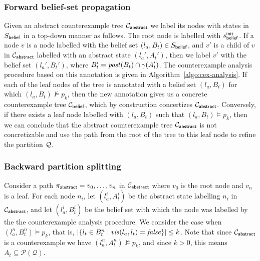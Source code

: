 \subsubsection{Forward belief-set propagation}
Given an abstract counterexample tree $\mathcal{C}_{\mathsf{abstract}}$ we label its nodes with states in $S_{\mathsf{belief}}$ in a top-down manner as follows. 
The root node is labelled with $s_{\mathsf{belief}}^{\mathsf{init}}$. If a node $v$ is a node labelled with the belief set $(l_a,B_t) \in S_{\mathsf{belief}}$, and  $v'$ is a child of $v$ in $\mathcal{C}_{\mathsf{abstract}}$ labelled with an abstract state $(l_a',A_t')$, then we label $v'$ with the belief set $(l_a',B_t')$, where 
$B_t' = \mathit{post}(B_t) \cap \gamma(A_t')$. The counterexample analysis procedure based on this annotation is given in Algorithm~\ref{algo:cex-analysis}.
If each of the leaf nodes of the tree is annotated with a belief set $(l_a,B_t)$ for which $(l_a,B_t) \not\models p_k$, then the new annotation gives us a concrete counterexample tree $\mathcal{C}_{\mathsf{belief}}$, which by construction concertizes $\mathcal{C}_{\mathsf{abstract}}$. Conversely, if there exists a leaf node labelled with $(l_a,B_t)$ such that $(l_a,B_t) \models p_k$, then we can conclude that the abstract counterexample tree $\mathcal{C}_{\mathsf{abstract}}$ is not concretizable and use the path from the root of the tree to this leaf node to refine the partition $\mathcal{Q}$.

\begin{theorem}
\end{theorem}

\subsubsection{Backward partition splitting}
Consider a path $\pi_{\mathsf{abstract}} = v_0,\ldots, v_n$ in $\mathcal{C}_{\mathsf{abstract}}$ where $v_0$ is the root node and $v_n$ is a leaf. For each node $n_i$, let $(l_a^i,A_t^i) $ be the abstract state labelling $n_i$ in $\mathcal{C}_{\mathsf{abstract}}$, and let $(l_a^i,B_t^i)$ be the  belief set with which the node was labelled by the the counterexample analysis procedure. We consider the case when $(l_a^n,B_t^n) \models p_k$, that is, $|\{l_t \in B_t^n \mid \mathit{vis}(l_a,l_t) = \mathit{false}\}| \leq k$.
Note that since $\mathcal{C}_{\mathsf{abstract}}$ is a counterexample we have $(l_a^n,A_t^n) \not \models p_k$, and since $k>0$, this means $A_t \subseteq \mathcal{P}(\mathcal Q)$.



